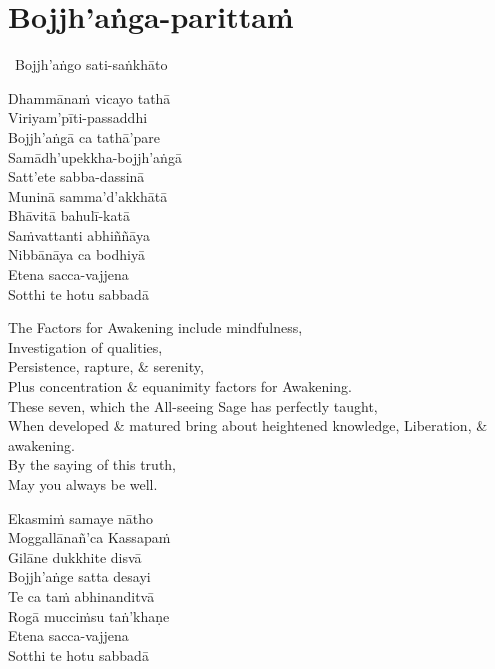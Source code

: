 \suttaRef{[MJG]}

\section{Bojjh'aṅga-parittaṁ}
\label{bojjhana-parittam}

\begin{pali-leader}
  \anglebracketleft\ \hspace{-0.5mm}Bojjh'aṅgo sati-saṅkhāto \hspace{-0.5mm}\anglebracketright\
\end{pali-leader}
\begin{pali-hangtogether}
  Dhammānaṁ vicayo tathā\\
  Viriyam'pīti-passaddhi\\
  Bojjh'aṅgā ca tathā'pare\\
  Samādh'upekkha-bojjh'aṅgā\\
  Satt'ete sabba-dassinā\\
  Muninā samma'd'akkhātā\\
  Bhāvitā bahulī-katā\\
  Saṁvattanti abhiññāya\\
  Nibbānāya ca bodhiyā\\
  Etena sacca-vajjena\\
  Sotthi te hotu sabbadā
\end{pali-hangtogether}

\begin{english-verses}
  The Factors for Awakening include mindfulness,\\
  Investigation of qualities,\\
  Persistence, rapture, \& serenity,\\
  Plus concentration \& equanimity factors for Awakening.\\
  These seven, which the All-seeing Sage has perfectly taught,\\
  When developed \& matured bring about heightened knowledge, Liberation, \& awakening.\\
  By the saying of this truth,\\
  May you always be well.
\end{english-verses}

\begin{pali-hang-continued}
  Ekasmiṁ samaye nātho\\
  Moggallānañ'ca Kassapaṁ\\
  Gilāne dukkhite disvā\\
  Bojjh'aṅge satta desayi\\
  Te ca taṁ abhinanditvā\\
  Rogā mucciṁsu taṅ'khaṇe\\
  Etena sacca-vajjena\\
  Sotthi te hotu sabbadā
\end{pali-hang-continued}

